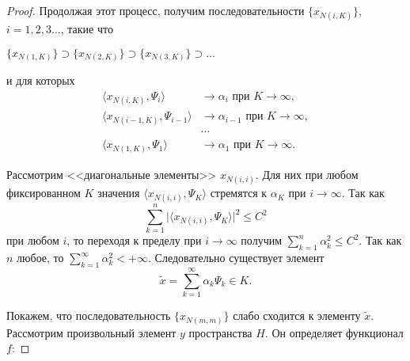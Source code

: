 \documentclass[12pt,a4paper,titlepage,oneside]{book}
\theoremstyle{definition}
\theoremstyle{plain}
\theoremstyle{break}
\theoremstyle{remark}
\theoremstyle{remark}
\theoremstyle{remark}
\theoremstyle{remark}
\theoremstyle{plain}
\theoremstyle{plain}
\begin{document}
\begin{proof}
Продолжая этот процесс, получим последовательности 
$\lbrace x_{N(i,K)} \rbrace$, $i=1,2,3\ldots$, такие что 
 \begin{center}
 $\lbrace x_{N(1,K)} \rbrace \supset
\lbrace x_{N(2,K)} \rbrace \supset
\lbrace x_{N(3,K)} \rbrace \supset \ldots$
\end{center}
и для которых
\begin{align*}
\langle x_{N(i,K)},\Psi_i \rangle &\to \alpha_i \mbox{ при } K\to\infty,\\
\langle x_{N(i-1,K)},\Psi_{i-1} \rangle &\to \alpha_{i-1} \mbox{ при } K\to\infty,\\
&\cdots\\
\langle x_{N(1,K)},\Psi_{1} \rangle &\to \alpha_{1} \mbox{ при } K\to\infty.
\end{align*}

Рассмотрим <<диагональные элементы>> $ x_{N(i,i)}$. Для них при любом фиксированном $K$ значения $\langle x_{N(i,i)},\Psi_K \rangle $ стремятся к $\alpha_K$ при  $i \to \infty$. Так как
\begin{equation*}
 \sum\limits_{k=1}^n 
{\vert \langle x_{N(i,i)},\Psi_K \rangle  \vert}^2 \leqslant C^2
\end{equation*}
  при любом $i$, то переходя к пределу при $i\to\infty$ получим $\sum\limits_{k=1}^n \alpha_k^2 \leqslant C^2$. Так как $n$ любое, то $\sum\limits_{k=1}^\infty \alpha_k^2 <+\infty$. Следовательно существует элемент 
\begin{equation*}
\widetilde{x}= \sum\limits_{k=1}^\infty 
\alpha_k\Psi_{k} \in K.
\end{equation*}

Покажем, что последовательность $\lbrace x_{N(m,m)} \rbrace$ слабо сходится к элементу $\widetilde{x}$. Рассмотрим произвольный элемент $y$ пространства $H$. Он определяет функционал $f$:
 

\end{proof}
\end{document}

